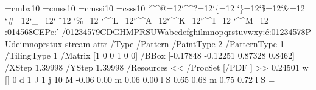 \font\THFa=cmbx10
\font\THFb=cmss10
\font\THFd=cmssi10
\font\THFc=csss10
\begingroup
\catcode`\^^@=12\catcode`\^^?=12\catcode`\{=12
\catcode`\}=12\catcode`\$=12\catcode`\&=12
\catcode`\#=12\catcode`\_=12\catcode`\~=12
\catcode`\%=12
\catcode`\^^L=12\catcode`\^^A=12\catcode`\^^K=12\catcode`\^^I=12
\catcode`\^^M=12
\THFa:014568CEPe\endinclude{}\THFb:'-/01234579CDGHMPRSUWabcdefghilmnopqrstuvwxy\endinclude{}\THFc:^^e9\endinclude{}\THFd:01234578PUdeimnoprstux\endinclude\endgroup
\immediate\pdfobj stream attr {/Type /Pattern
/PaintType 2 /PatternType 1 /TilingType 1
/Matrix [1 0 0 1 0 0]
/BBox [-0.17848 -0.12251 0.87328 0.8462]
/XStep 1.39998
/YStep 1.39998
/Resources << /ProcSet [/PDF ] >>} {
0.24501 w
[] 0 d
1 J
1 j
10 M
-0.06 0.00 m
0.06 0.00 l
S
0.65 0.68 m
0.75 0.72 l
S
} \newcount \THPa\THPa=\pdflastobj
